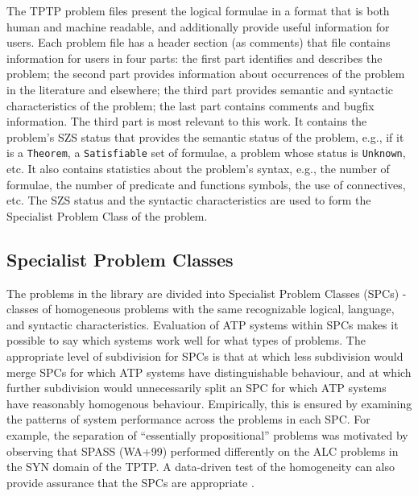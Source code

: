 \documentclass[runningheads]{llncs}
\begin{document}
The TPTP problem files present the logical formulae in a format that is both human and machine 
readable, and additionally provide useful information for users.
Each problem file has a header section (as comments) that file contains information for users
in four parts:
the first part identifies and describes the problem;
the second part provides information about occurrences of the problem in the literature and 
elsewhere;
the third part provides semantic and syntactic characteristics of the problem;
the last part contains comments and bugfix information.
The third part is most relevant to this work. 
It contains the problem's SZS status \cite{SZS03} that provides the semantic status of the 
problem, e.g., if it is a {\tt Theorem}, a {\tt Satisfiable} set of formulae, a problem whose 
status is {\tt Unknown}, etc.
It also contains statistics about the problem's syntax, e.g., the number of formulae, the 
number of predicate and functions symbols, the use of connectives, etc.
The SZS status and the syntactic characteristics are used to form the Specialist Problem Class
of the problem.

\subsection{Specialist Problem Classes}
\label{SPCs}

The problems in the library are divided into Specialist Problem Classes (SPCs) - classes of 
homogeneous problems with the same recognizable logical, language, and syntactic characteristics.
Evaluation of ATP systems within SPCs makes it possible to say which systems work well for what 
types of problems. 
The appropriate level of subdivision for SPCs is that at which less subdivision would merge 
SPCs for which ATP systems have distinguishable behaviour, and at which further subdivision
would unnecessarily split an SPC for which ATP systems have reasonably homogenous behaviour.
Empirically, this is ensured by examining the patterns of system performance across the 
problems in each SPC. 
For example, the separation of ``essentially propositional'' problems was motivated by 
observing that SPASS (WA+99) performed differently on the ALC problems in the SYN domain of the 
TPTP.
A data-driven test of the homogeneity can also provide assurance that the SPCs are
appropriate \cite{FS02}.
\end{document}
